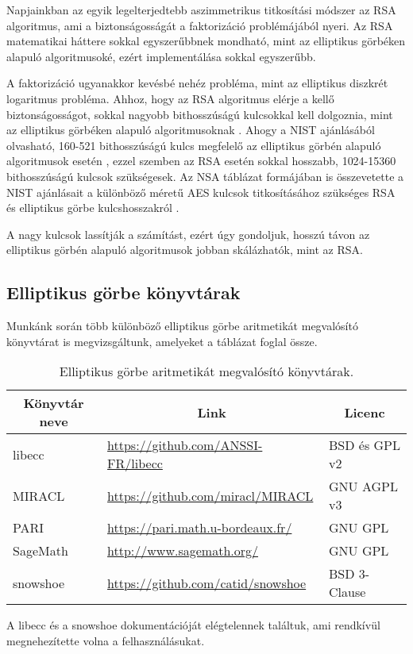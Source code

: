 Napjainkban az egyik legelterjedtebb aszimmetrikus titkosítási módszer az RSA algoritmus, ami a biztonságosságát a faktorizáció problémájából nyeri. Az RSA matematikai háttere sokkal egyszerűbbnek mondható, mint az elliptikus görbéken alapuló algoritmusoké, ezért implementálása sokkal egyszerűbb.

A faktorizáció ugyanakkor kevésbé nehéz probléma, mint az elliptikus diszkrét logaritmus probléma. Ahhoz, hogy az RSA algoritmus elérje a kellő biztonságosságot, sokkal nagyobb bithosszúságú kulcsokkal kell dolgoznia, mint az elliptikus görbéken alapuló algoritmusoknak \cite{Miller::ECC}. Ahogy a NIST ajánlásából olvasható, 160-521 bithosszúságú kulcs megfelelő az elliptikus görbén alapuló algoritmusok esetén \cite{NIST::EllipticCurve}, ezzel szemben az RSA esetén sokkal hosszabb, 1024-15360 bithosszúságú kulcsok szükségesek. Az NSA táblázat formájában is összevetette a NIST ajánlásait a különböző méretű AES kulcsok titkosításához szükséges RSA és elliptikus görbe kulcshosszakról \cite{NSA::EllipticCurve}.

A nagy kulcsok lassítják a számítást, ezért úgy gondoljuk, hosszú távon az elliptikus görbén alapuló algoritmusok jobban skálázhatók, mint az RSA.

\subsection{Elliptikus görbe könyvtárak}

Munkánk során több különböző elliptikus görbe aritmetikát megvalósító könyvtárat is megvizsgáltunk, amelyeket a  táblázat foglal össze.
\begin{table}[H]
    \centering
    \begin{tabular}{|l|l|l|}
        \hline
        \multicolumn{1}{|c|}{\textbf{Könyvtár neve}} & \multicolumn{1}{c|}{\textbf{Link}} & \multicolumn{1}{c|}{\textbf{Licenc}} \\ \hline
        libecc                                       & \url{https://github.com/ANSSI-FR/libecc} & BSD és GPL v2                         \\ \hline
        MIRACL                                       & \url{https://github.com/miracl/MIRACL}   & GNU AGPL v3                           \\ \hline
        PARI                                         & \url{https://pari.math.u-bordeaux.fr/}   & GNU GPL                               \\ \hline
        SageMath                                     & \url{http://www.sagemath.org/}           & GNU GPL                               \\ \hline
        snowshoe                                     & \url{https://github.com/catid/snowshoe}  & BSD 3-Clause                          \\ \hline
    \end{tabular}
    \caption{Elliptikus görbe aritmetikát megvalósító könyvtárak.}
    \label{table::ECLibs}
\end{table}
A libecc és a snowshoe dokumentációját elégtelennek találtuk, ami rendkívül megnehezítette volna a felhasználásukat.

